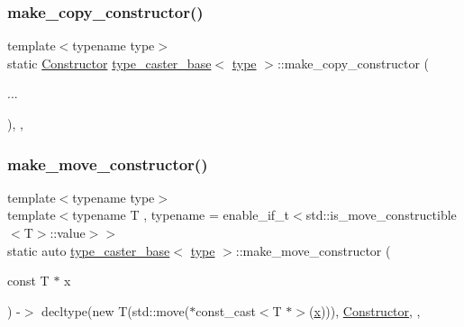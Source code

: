 \mbox{\label{classtype__caster__base_a8d096e63217768f54daacdfc1cfb4b22}} 
\subsubsection{\texorpdfstring{make\_copy\_constructor()}{make\_copy\_constructor()}\hspace{0.1cm}{\footnotesize\ttfamily [2/2]}}
{\footnotesize\ttfamily template$<$typename type$>$ \\
static \mbox{\hyperlink{classtype__caster__base_ab5020d71e0fb1d9e827af0f280c575ac}{Constructor}} \mbox{\hyperlink{classtype__caster__base}{type\+\_\+caster\+\_\+base}}$<$ \mbox{\hyperlink{_s_d_l__opengl_8h_ad5ddf6fca7b585646515660e810e0188}{type}} $>$\+::make\+\_\+copy\+\_\+constructor (\begin{DoxyParamCaption}\item[{}]{... }\end{DoxyParamCaption})\hspace{0.3cm}{\ttfamily [inline]}, {\ttfamily [static]}, {\ttfamily [protected]}}

\mbox{\label{classtype__caster__base_a0a667ee7f1da87bf7efd2b75d5108975}} 
\subsubsection{\texorpdfstring{make\_move\_constructor()}{make\_move\_constructor()}\hspace{0.1cm}{\footnotesize\ttfamily [1/2]}}
{\footnotesize\ttfamily template$<$typename type$>$ \\
template$<$typename T , typename  = enable\+\_\+if\+\_\+t$<$std\+::is\+\_\+move\+\_\+constructible$<$\+T$>$\+::value$>$$>$ \\
static auto \mbox{\hyperlink{classtype__caster__base}{type\+\_\+caster\+\_\+base}}$<$ \mbox{\hyperlink{_s_d_l__opengl_8h_ad5ddf6fca7b585646515660e810e0188}{type}} $>$\+::make\+\_\+move\+\_\+constructor (\begin{DoxyParamCaption}\item[{const T $\ast$}]{x }\end{DoxyParamCaption}) -\/$>$ decltype(new T(std\+::move($\ast$const\+\_\+cast$<$T $\ast$$>$(\mbox{\hyperlink{_s_d_l__opengl_8h_ad0e63d0edcdbd3d79554076bf309fd47}{x}}))), \mbox{\hyperlink{classtype__caster__base_ab5020d71e0fb1d9e827af0f280c575ac}{Constructor}}\hspace{0.3cm}{\ttfamily [inline]}, {\ttfamily [static]}, {\ttfamily [protected]}}

